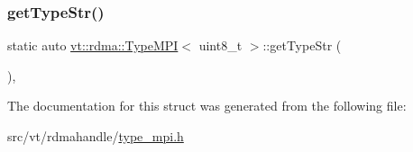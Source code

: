 \mbox{\label{structvt_1_1rdma_1_1_type_m_p_i_3_01uint8__t_01_4_a64e73c797cd39594ed7c0882a49aa5b1}} 
\subsubsection{\texorpdfstring{get\+Type\+Str()}{getTypeStr()}}
{\footnotesize\ttfamily static auto \hyperlink{structvt_1_1rdma_1_1_type_m_p_i}{vt\+::rdma\+::\+Type\+M\+PI}$<$ uint8\+\_\+t $>$\+::get\+Type\+Str (\begin{DoxyParamCaption}{ }\end{DoxyParamCaption})\hspace{0.3cm}{\ttfamily [inline]}, {\ttfamily [static]}}



The documentation for this struct was generated from the following file\+:\begin{DoxyCompactItemize}
\item 
src/vt/rdmahandle/\hyperlink{type__mpi_8h}{type\+\_\+mpi.\+h}\end{DoxyCompactItemize}
